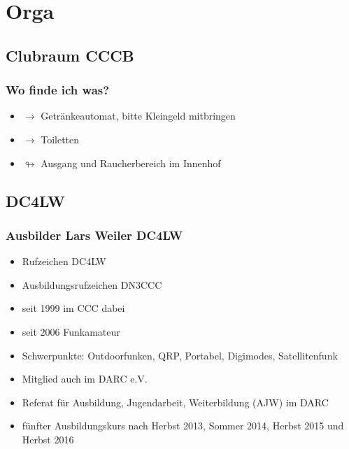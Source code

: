 

\usepackage{amssymb}
\subtitle{Organisatorisches 00\\[2em]}
\date{Stand 18.09.2017}



\section{Orga}

\subsection{Clubraum CCCB}

\begin{frame}
    \frametitle{Wo finde ich was?}

    \begin{itemize}
      \item $\rightarrow$ Getränkeautomat, bitte Kleingeld mitbringen
      \item $\longrightarrow$ Toiletten
      \item $\looparrowright$ Ausgang und Raucherbereich im Innenhof
    \end{itemize}
\end{frame}


\subsection{DC4LW}

\begin{frame}
  \frametitle{Ausbilder Lars Weiler DC4LW}

  \begin{itemize}
    \item Rufzeichen DC4LW
    \item Ausbildungsrufzeichen DN3CCC
    \item seit 1999 im CCC dabei
    \item seit 2006 Funkamateur
    \item Schwerpunkte: Outdoorfunken, QRP, Portabel, Digimodes, Satellitenfunk
    \item Mitglied auch im DARC e.V.
    \item Referat für Ausbildung, Jugendarbeit, Weiterbildung (AJW) im DARC
    \item fünfter Ausbildungskurs nach Herbst 2013, Sommer 2014, Herbst 2015 und Herbst 2016
  \end{itemize}
\end{frame}


